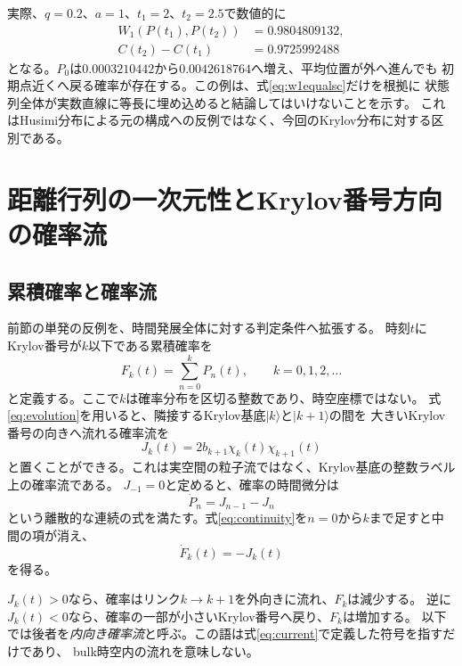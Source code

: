 \documentclass[a4paper,11pt]{ltjsarticle}
\numberwithin{equation}{section}
\newcommand{\ket}[1]{\lvert #1\rangle}
\begin{document}
実際、$q=0.2$、$a=1$、$t_1=2$、$t_2=2.5$で数値的に
\begin{align}
 W_1(P(t_1),P(t_2))&=0.9804809132,\\
 C(t_2)-C(t_1)&=0.9725992488
 \label{eq:counterexample}
\end{align}
となる。$P_0$は$0.0003210442$から$0.0042618764$へ増え、平均位置が外へ進んでも
初期点近くへ戻る確率が存在する。この例は、式\eqref{eq:w1equalsc}だけを根拠に
状態列全体が実数直線に等長に埋め込めると結論してはいけないことを示す。
これはHusimi分布による元の構成への反例ではなく、今回のKrylov分布に対する区別である。

\section{距離行列の一次元性とKrylov番号方向の確率流}
\subsection{累積確率と確率流}
前節の単発の反例を、時間発展全体に対する判定条件へ拡張する。
時刻$t$にKrylov番号が$k$以下である累積確率を
\begin{equation}
 F_k(t)=\sum_{n=0}^{k}P_n(t),\qquad k=0,1,2,\ldots
 \label{eq:cdf-time}
\end{equation}
と定義する。ここで$k$は確率分布を区切る整数であり、時空座標ではない。
式\eqref{eq:evolution}を用いると、隣接するKrylov基底$\ket{k}$と$\ket{k+1}$の間を
大きいKrylov番号の向きへ流れる確率流を
\begin{equation}
 J_k(t)=2b_{k+1}\chi_k(t)\chi_{k+1}(t)
 \label{eq:current}
\end{equation}
と置くことができる。これは実空間の粒子流ではなく、Krylov基底の整数ラベル上の確率流である。
$J_{-1}=0$と定めると、確率の時間微分は
\begin{equation}
 \dot P_n=J_{n-1}-J_n
 \label{eq:continuity}
\end{equation}
という離散的な連続の式を満たす。式\eqref{eq:continuity}を$n=0$から$k$まで足すと中間の項が消え、
\begin{equation}
 \boxed{\dot F_k(t)=-J_k(t)}
 \label{eq:cdf-current}
\end{equation}
を得る。

$J_k(t)>0$なら、確率はリンク$k\to k+1$を外向きに流れ、$F_k$は減少する。
逆に$J_k(t)<0$なら、確率の一部が小さいKrylov番号へ戻り、$F_k$は増加する。
以下では後者を\emph{内向き確率流}と呼ぶ。この語は式\eqref{eq:current}で定義した符号を指すだけであり、
bulk時空内の流れを意味しない。
\end{document}

